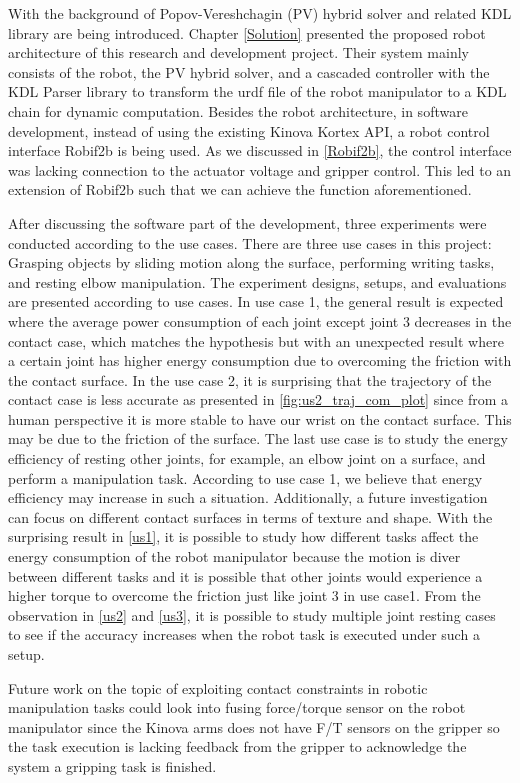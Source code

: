 \documentclass[report.tex]{subfiles}
\begin{document}
With the background of Popov-Vereshchagin (PV) hybrid solver and related KDL library are being introduced. Chapter \ref{Solution} presented the proposed robot architecture of this research and development project. Their system mainly consists of the robot, the PV hybrid solver, and a cascaded controller with the KDL Parser library to transform the urdf file of the robot manipulator to a KDL chain for dynamic computation. Besides the robot architecture, in software development, instead of using the existing Kinova Kortex API, a robot control interface Robif2b is being used. As we discussed in \ref{Robif2b}, the control interface was lacking connection to the actuator voltage and gripper control. This led to an extension of Robif2b such that we can achieve the function aforementioned.

After discussing the software part of the development, three experiments were conducted according to the use cases. There are three use cases in this project: Grasping objects by sliding motion along the surface, performing writing tasks, and resting elbow manipulation. The experiment designs, setups, and evaluations are presented according to use cases. In use case 1, the general result is expected where the average power consumption of each joint except joint 3 decreases in the contact case, which matches the hypothesis but with an unexpected result where a certain joint has higher energy consumption due to overcoming the friction with the contact surface. In the use case 2, it is surprising that the trajectory of the contact case is less accurate as presented in \ref{fig:us2_traj_com_plot} since from a human perspective it is more stable to have our wrist on the contact surface. This may be due to the friction of the surface. The last use case is to study the energy efficiency of resting other joints, for example, an elbow joint on a surface, and perform a manipulation task. According to use case 1, we believe that energy efficiency may increase in such a situation. Additionally, a future investigation can focus on different contact surfaces in terms of texture and shape. With the surprising result in \ref{us1}, it is possible to study how different tasks affect the energy consumption of the robot manipulator because the motion is diver between different tasks and it is possible that other joints would experience a higher torque to overcome the friction just like joint 3 in use case1. From the observation in \ref{us2} and \ref{us3}, it is possible to study multiple joint resting cases to see if the accuracy increases when the robot task is executed under such a setup.

Future work on the topic of exploiting contact constraints in robotic manipulation tasks could look into fusing force/torque sensor on the robot manipulator since the Kinova arms does not have F/T sensors on the gripper so the task execution is lacking feedback from the gripper to acknowledge the system a gripping task is finished.
\end{document}
